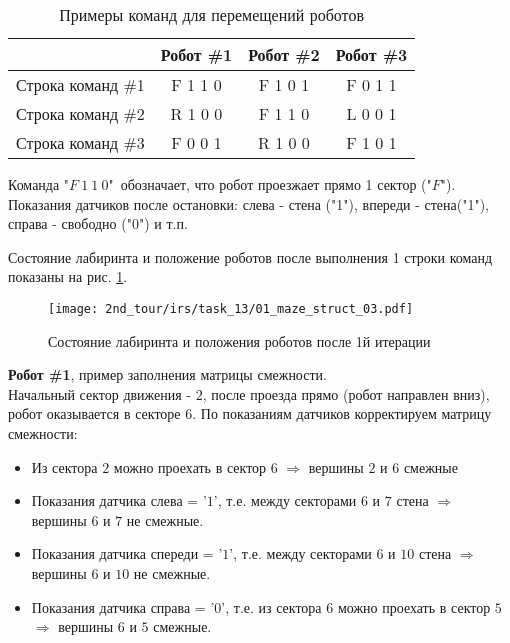\begin{table}[h!]
	\begin{center}
		\begin{tabular}{|c|c|c|c|}
			\hline 
			& Робот \#1 & Робот \#2 & Робот \#3 \\ 
			\hline 
			Строка команд \#1 & F 1 1 0 & F 1 0 1 & F 0 1 1 \\ 
			\hline 
			Строка команд \#2 & R 1 0 0 & F 1 1 0 & L 0 0 1 \\ 
			\hline 
			Строка команд \#3 & F 0 0 1 & R 1 0 0 & F 1 0 1 \\ 
			\hline 
		\end{tabular} 
		\caption{Примеры команд для перемещений роботов}
		\label{table:01_maze_struct_01}
	\end{center}
\end{table}


Команда "$F\ 1\ 1\ 0$"\ обозначает, что робот проезжает прямо 1 сектор ("$F$"). Показания датчиков после остановки: слева - стена ("1"), впереди - стена("1"), справа - свободно ("0") и т.п. 

Состояние лабиринта и положение роботов после выполнения 1 строки команд показаны на рис. \ref{fig:01_maze_struct_03}.
\begin{figure}[h!]
	\centering
	\texttt{[image: 2nd\_tour/irs/task\_13/01\_maze\_struct\_03.pdf]}
	\caption{Состояние лабиринта и положения роботов после 1й итерации}
	\label{fig:01_maze_struct_03}
\end{figure}

\textbf{Робот \#1}, пример заполнения матрицы смежности.\\ Начальный сектор движения - $2$, после проезда прямо (робот направлен вниз), робот оказывается в секторе $6$. По показаниям датчиков корректируем матрицу смежности: 
\begin{itemize}
	\item Из сектора $2$ можно проехать в сектор $6$ $\Rightarrow$ вершины $2$ и $6$ смежные
	\item Показания датчика слева = '$1$', т.е. между секторами $6$ и $7$ стена $\Rightarrow$ вершины $6$ и $7$ не смежные.
	\item Показания датчика спереди = '$1$', т.е. между секторами $6$ и $10$ стена $\Rightarrow$ вершины $6$ и $10$ не смежные.
	\item Показания датчика справа = '$0$', т.е. из сектора $6$ можно проехать в сектор $5$ $\Rightarrow$ вершины $6$ и $5$ смежные.
\end{itemize}


